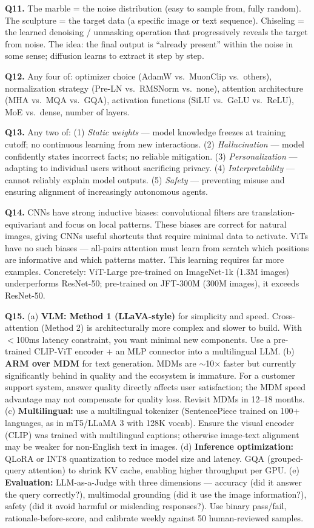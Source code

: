 \documentclass[11pt, a4paper]{article}
\begin{document}
\textbf{Q11.} The marble = the noise distribution (easy to sample from, fully random). The sculpture = the target data (a specific image or text sequence). Chiseling = the learned denoising / unmasking operation that progressively reveals the target from noise. The idea: the final output is ``already present'' within the noise in some sense; diffusion learns to extract it step by step.

\textbf{Q12.} Any four of: optimizer choice (AdamW vs.\ MuonClip vs.\ others), normalization strategy (Pre-LN vs.\ RMSNorm vs.\ none), attention architecture (MHA vs.\ MQA vs.\ GQA), activation functions (SiLU vs.\ GeLU vs.\ ReLU), MoE vs.\ dense, number of layers.

\textbf{Q13.} Any two of: (1) \textit{Static weights} --- model knowledge freezes at training cutoff; no continuous learning from new interactions. (2) \textit{Hallucination} --- model confidently states incorrect facts; no reliable mitigation. (3) \textit{Personalization} --- adapting to individual users without sacrificing privacy. (4) \textit{Interpretability} --- cannot reliably explain model outputs. (5) \textit{Safety} --- preventing misuse and ensuring alignment of increasingly autonomous agents.

\textbf{Q14.} CNNs have strong inductive biases: convolutional filters are translation-equivariant and focus on local patterns. These biases are correct for natural images, giving CNNs useful shortcuts that require minimal data to activate. ViTs have no such biases --- all-pairs attention must learn from scratch which positions are informative and which patterns matter. This learning requires far more examples. Concretely: ViT-Large pre-trained on ImageNet-1k (1.3M images) underperforms ResNet-50; pre-trained on JFT-300M (300M images), it exceeds ResNet-50.

\textbf{Q15.} (a) \textbf{VLM: Method 1 (LLaVA-style)} for simplicity and speed. Cross-attention (Method 2) is architecturally more complex and slower to build. With $<$100ms latency constraint, you want minimal new components. Use a pre-trained CLIP-ViT encoder + an MLP connector into a multilingual LLM. (b) \textbf{ARM over MDM} for text generation. MDMs are $\sim$10$\times$ faster but currently significantly behind in quality and the ecosystem is immature. For a customer support system, answer quality directly affects user satisfaction; the MDM speed advantage may not compensate for quality loss. Revisit MDMs in 12--18 months. (c) \textbf{Multilingual:} use a multilingual tokenizer (SentencePiece trained on 100+ languages, as in mT5/LLaMA 3 with 128K vocab). Ensure the visual encoder (CLIP) was trained with multilingual captions; otherwise image-text alignment may be weaker for non-English text in images. (d) \textbf{Inference optimization:} QLoRA or INT8 quantization to reduce model size and latency. GQA (grouped-query attention) to shrink KV cache, enabling higher throughput per GPU. (e) \textbf{Evaluation:} LLM-as-a-Judge with three dimensions --- accuracy (did it answer the query correctly?), multimodal grounding (did it use the image information?), safety (did it avoid harmful or misleading responses?). Use binary pass/fail, rationale-before-score, and calibrate weekly against 50 human-reviewed samples.
\end{document}
